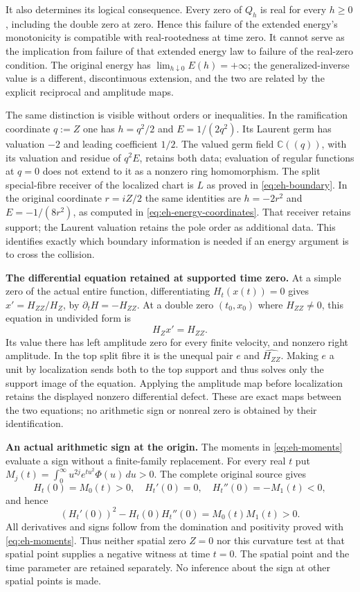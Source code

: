 \documentclass[11pt,a4paper]{article}
\theoremstyle{definition}\newtheorem{definition}[theorem]{Definition}
\begin{document}
It also determines its logical consequence. Every zero of $Q_h$ is
real for every $h\ge0$, including the double zero at zero. Hence this
failure of the extended energy's monotonicity is compatible with
real-rootedness at time zero. It cannot serve as the implication from
failure of that extended energy law to failure of the real-zero
condition. The original energy has $\lim_{h\downarrow0}E(h)=+\infty$;
the generalized-inverse value is a different, discontinuous extension,
and the two are related by the explicit reciprocal and amplitude maps.

The same distinction is visible without orders or inequalities. In
the ramification coordinate $q:=Z$ one has $h=q^2/2$ and
$E=1/(2q^2)$. Its Laurent germ has valuation $-2$ and leading
coefficient $1/2$. The valued germ field $\mathbb C((q))$, with its
valuation and residue of $q^2E$, retains both data; evaluation of
regular functions at $q=0$ does not extend to it as a nonzero
ring homomorphism. The split special-fibre receiver of the localized
chart is $L$ as proved in \eqref{eq:eh-boundary}. In the original
coordinate $r=iZ/2$ the same identities are $h=-2r^2$ and
$E=-1/(8r^2)$, as computed in \eqref{eq:eh-energy-coordinates}.
That receiver retains support;
the Laurent valuation retains the pole order as additional data.
This identifies exactly which boundary information is needed if an
energy argument is to cross the collision.

\RD\textbf{The differential equation retained at supported time zero.}
At a simple zero of the actual entire function, differentiating
$H_t(x(t))=0$ gives
$x'=H_{ZZ}/H_Z$, by $\partial_tH=-H_{ZZ}$.
At a double zero $(t_0,x_0)$ where $H_{ZZ}\ne0$, this equation in
undivided form is
\[
 H_Z x'=H_{ZZ}.
\]
Its value there has left amplitude zero for every finite velocity,
and nonzero right amplitude. In the top split fibre it is the
unequal pair $e$ and $\widehat{H_{ZZ}}$. Making $e$ a unit by
localization sends both to the top support and thus solves only
the support image of the equation. Applying the amplitude map
before localization retains the displayed nonzero differential
defect. These are exact maps between the two equations; no
arithmetic sign or nonreal zero is obtained by their identification.

\RD\textbf{An actual arithmetic sign at the origin.}
The moments in \eqref{eq:eh-moments} evaluate a sign without a finite-family
replacement. For every real $t$ put
$M_j(t)=\int_0^\infty u^{2j}e^{tu^2}\Phi(u)\,du>0$.
The complete original source gives
\[
 H_t(0)=M_0(t)>0,\quad H_t'(0)=0,\quad H_t''(0)=-M_1(t)<0,
\]
and hence
\[
 (H_t'(0))^2-H_t(0)H_t''(0)=M_0(t)M_1(t)>0.
\]
All derivatives and signs follow from the domination and positivity
proved with \eqref{eq:eh-moments}. Thus neither spatial zero $Z=0$ nor this curvature
test at that spatial point supplies a negative witness at time $t=0$.
The spatial point and the time parameter are retained separately.
No inference about the sign at other spatial points is made.
\end{document}

